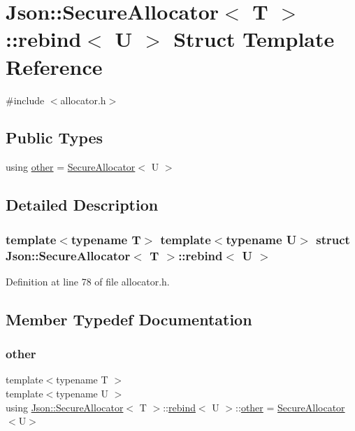 \hypertarget{struct_json_1_1_secure_allocator_1_1rebind}{}\section{Json\+:\+:Secure\+Allocator$<$ T $>$\+:\+:rebind$<$ U $>$ Struct Template Reference}
\label{struct_json_1_1_secure_allocator_1_1rebind}


{\ttfamily \#include $<$allocator.\+h$>$}

\subsection*{Public Types}
\begin{DoxyCompactItemize}
\item 
using \hyperlink{struct_json_1_1_secure_allocator_1_1rebind_a010e346391d92ab9f8b0d2e807965615}{other} = \hyperlink{class_json_1_1_secure_allocator}{Secure\+Allocator}$<$ U $>$
\end{DoxyCompactItemize}


\subsection{Detailed Description}
\subsubsection*{template$<$typename T$>$\newline
template$<$typename U$>$\newline
struct Json\+::\+Secure\+Allocator$<$ T $>$\+::rebind$<$ U $>$}



Definition at line 78 of file allocator.\+h.



\subsection{Member Typedef Documentation}
\hypertarget{struct_json_1_1_secure_allocator_1_1rebind_a010e346391d92ab9f8b0d2e807965615}{}\label{struct_json_1_1_secure_allocator_1_1rebind_a010e346391d92ab9f8b0d2e807965615} 
\subsubsection{\texorpdfstring{other}{other}}
{\footnotesize\ttfamily template$<$typename T $>$ \\
template$<$typename U $>$ \\
using \hyperlink{class_json_1_1_secure_allocator}{Json\+::\+Secure\+Allocator}$<$ T $>$\+::\hyperlink{struct_json_1_1_secure_allocator_1_1rebind}{rebind}$<$ U $>$\+::\hyperlink{struct_json_1_1_secure_allocator_1_1rebind_a010e346391d92ab9f8b0d2e807965615}{other} =  \hyperlink{class_json_1_1_secure_allocator}{Secure\+Allocator}$<$U$>$}



